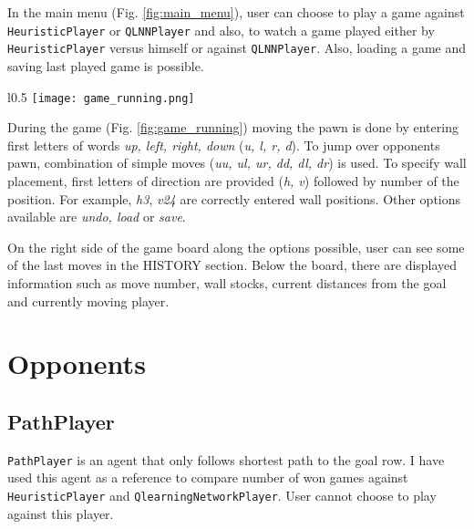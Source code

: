 In the main menu (Fig. \ref{fig:main_menu}), user can choose to play a game
against {\lstinline{HeuristicPlayer}} or {\lstinline{QLNNPlayer}} and also,
to watch a game played either by {\lstinline{HeuristicPlayer}} versus himself
or against {\lstinline{QLNNPlayer}}. Also, loading a game and saving last
played game is possible.

\begin{wrapfigure}{l}{0.5\textwidth}
  \vspace*{-0.35cm}
  \centering
  \texttt{[image: game\_running.png]}
  \vspace*{-0.30cm}
  \caption{game running}
  \label{fig:game_running}
  \vspace*{-0.60cm}
\end{wrapfigure}

During the game (Fig. \ref{fig:game_running}) moving the pawn is done by
entering first letters of words \textit{up, left, right, down}
(\textit{u, l, r, d}). To jump over opponents pawn, combination of simple
moves (\textit{uu, ul, ur, dd, dl, dr}) is used. To specify wall placement,
first letters of direction are provided (\textit{h, v}) followed by number
of the position.  For example, \textit{h3}, \textit{v24} are correctly entered
wall positions. Other options available are \textit{undo, load} or
\textit{save}.

On the right side of the game board along the options possible, user can see
some of the last moves in the HISTORY section. Below the board, there are
displayed information such as move number, wall stocks, current distances from
the goal and currently moving player.

\section{Opponents}
\subsection{PathPlayer}
{\lstinline{PathPlayer}} is an agent that only follows shortest path to the
goal row. I have used this agent as a reference to compare number of won games
against {\lstinline{HeuristicPlayer}} and {\lstinline{QlearningNetworkPlayer}}.
User cannot choose to play against this player.

